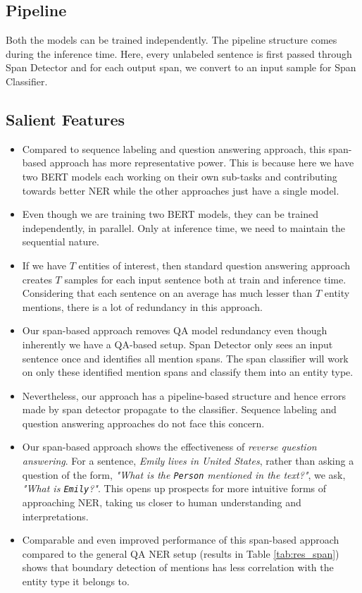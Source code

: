 \documentclass[11pt]{article}
\begin{document}
\subsection{Pipeline}
Both the models can be trained independently. The pipeline structure comes during the inference time. Here, every unlabeled sentence is first passed through Span Detector and for each output span, we convert to an input sample for Span Classifier.

\subsection{Salient Features}

\begin{itemize}
    \item Compared to sequence labeling and question answering approach, this span-based approach has more representative power. This is because here we have two BERT models each working on their own sub-tasks and contributing towards better NER while the other approaches just have a single model.
    
    \item Even though we are training two BERT models, they can be trained independently, in parallel. Only at inference time, we need to maintain the sequential nature.
    
    \item If we have $T$ entities of interest, then standard question answering approach creates $T$ samples for each input sentence both at train and inference time. Considering that each sentence on an average has much lesser than $T$ entity mentions, there is a lot of redundancy in this approach. 
    
    \item Our span-based approach removes QA model redundancy even though inherently we have a QA-based setup. Span Detector only sees an input sentence once and identifies all mention spans. The span classifier will work on only these identified mention spans and classify them into an entity type.
    
    \item Nevertheless, our approach has a pipeline-based structure and hence errors made by span detector propagate to the classifier. Sequence labeling and question answering approaches do not face this concern. 
    
    \item Our span-based approach shows the effectiveness of \textit{reverse question answering}. For a sentence, \textit{Emily lives in United States}, rather than asking a question of the form, \textit{"What is the \texttt{Person} mentioned in the text?"}, we ask, \textit{"What is \texttt{Emily}?"}. This opens up prospects for more intuitive forms of approaching NER, taking us closer to human understanding and interpretations.
    
    \item Comparable and even improved performance of this span-based approach compared to the general QA NER setup (results in Table \ref{tab:res_span}) shows that boundary detection of mentions has less correlation with the entity type it belongs to.
\end{itemize}
\end{document}
